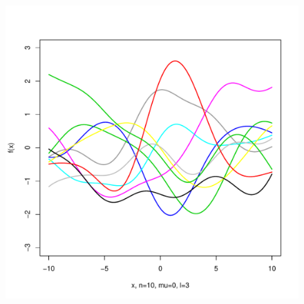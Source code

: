 \documentclass[12pt,letterpaper]{article}
\begin{document}
\begin{figure}
\begin{center}
\includegraphics[scale=0.2]{hw321/n10-m0-l3.pdf}
\end{center}
\end{figure}
\end{document}
